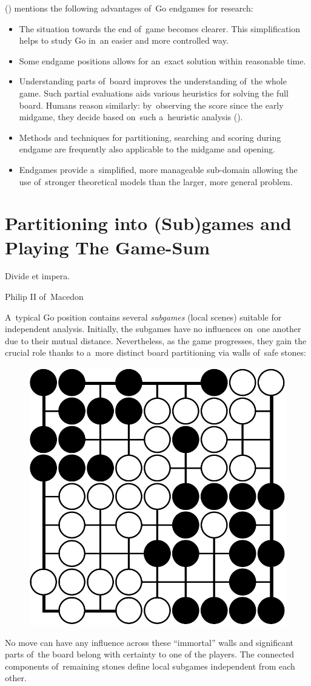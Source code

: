 (\cite{Muller1995computer}) mentions the following advantages of~Go endgames for research:
\begin{itemize}
  \item The situation towards the end of~game becomes clearer.
    This simplification helps to study Go in~an easier and more controlled way.
  \item Some endgame positions allows for an~exact solution within reasonable time.
  \item Understanding parts of~board improves the understanding of~the whole game.
    Such partial evaluations aids various heuristics for solving the full board.
    Humans reason similarly: by~observing the score since the early midgame, they decide based on~such a~heuristic analysis (\cite{Takagawa85}).
  \item Methods and techniques for partitioning, searching and scoring during endgame are frequently also applicable to the midgame and opening.
  \item Endgames provide a~simplified, more manageable sub-domain allowing the use of~stronger theoretical models than the larger, more general problem.
\end{itemize}

\section{Partitioning into (Sub)games and Playing The Game-Sum}
\epigraph{
  Divide et impera.
}{Philip II of~Macedon}
A~typical Go position contains several \emph{subgames} (local scenes) suitable for independent analysis.
Initially, the subgames have no influences on~one another due to their mutual distance.
Nevertheless, as the game progresses, they gain the crucial role thanks to a~more distinct board partitioning via walls of~safe stones:
\begin{figure}[H]
  \centering
  \includegraphics[width=.4\textwidth]{../img/late_endgame_Go_position_suited_for_exact_analysis.png}
  \label{fig:immortal-wall}
\end{figure}
No move can have any influence across these ``immortal'' walls and significant parts of~the board belong with certainty to one of the players.
The connected components of~remaining stones define local subgames independent from each other.

